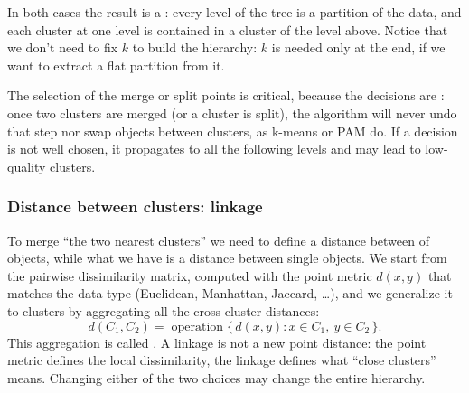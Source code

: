 \begin{center}
\end{center}

In both cases the result is a : every level of the tree is a partition of the data, and each cluster at one level is contained in a cluster of the level above. Notice that we don't need to fix $k$ to build the hierarchy: $k$ is needed only at the end, if we want to extract a flat partition from it.

\begin{remark}
The selection of the merge or split points is critical, because the decisions are : once two clusters are merged (or a cluster is split), the algorithm will never undo that step nor swap objects between clusters, as k-means or PAM do. If a decision is not well chosen, it propagates to all the following levels and may lead to low-quality clusters.
\end{remark}

\subsubsection{Distance between clusters: linkage}

To merge ``the two nearest clusters'' we need to define a distance between  of objects, while what we have is a distance between single objects. We start from the pairwise dissimilarity matrix, computed with the point metric $d(x,y)$ that matches the data type (Euclidean, Manhattan, Jaccard, \dots), and we generalize it to clusters by aggregating all the cross-cluster distances:
\[
  d(C_1, C_2) = \operatorname{operation}\{\, d(x,y) : x \in C_1,\ y \in C_2 \,\}.
\]
This aggregation is called . A linkage is not a new point distance: the point metric defines the local dissimilarity, the linkage defines what ``close clusters'' means. Changing either of the two choices may change the entire hierarchy.


